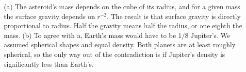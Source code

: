 (a) The asteroid's mass depends on the cube of its
radius, and for a given mass the surface gravity depends on
$r^{-2}$. The result is that surface gravity is directly
proportional to radius. Half the gravity means half the
radius, or one eighth the mass. (b) To agree with a, Earth's
mass would have to be 1/8 Jupiter's. We assumed spherical
shapes and equal density. Both planets are at least roughly
spherical, so the only way out of the contradiction is if
Jupiter's density is significantly less than Earth's.



